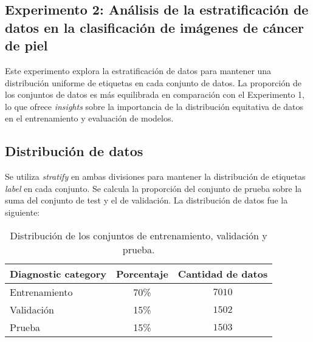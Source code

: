 \subsection{Experimento 2: Análisis de la estratificación de datos en la clasificación de imágenes de cáncer de piel}

Este experimento explora la estratificación de datos para mantener una distribución uniforme de etiquetas en cada conjunto de datos. La proporción de los conjuntos de datos es más equilibrada en comparación con el Experimento 1, lo que ofrece \textit{insights} sobre la importancia de la distribución equitativa de datos en el entrenamiento y evaluación de modelos.

\subsection{Distribución de datos}

Se utiliza \textit{stratify} en ambas divisiones para mantener la distribución de etiquetas \textit{label} en cada conjunto. Se calcula la proporción del conjunto de prueba sobre la suma del conjunto de test y el de validación. La distribución de datos fue la siguiente:

   \begin{table}[ht]
      \centering
      \begin{tabular}{lcc}
      \hline
      \textbf{Diagnostic category} & \textbf{Porcentaje} & \textbf{Cantidad de datos} \\
      \hline
      Entrenamiento       & 70\% &  $7010$ \\
      Validación      & 15\% & $1502$  \\
      Prueba      & 15\% & $1503$  \\ \hline
      \end{tabular}
      \caption{Distribución de los conjuntos de entrenamiento, validación y prueba.}
      \label{table:data_distribution_e2}
      \end{table}


